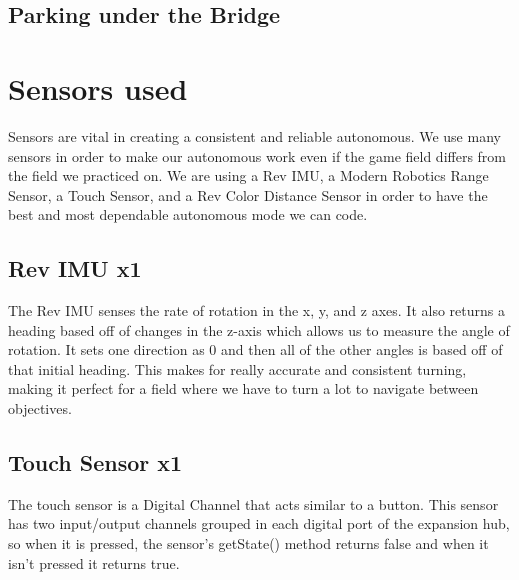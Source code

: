 \documentclass{article}[12pt]
\begin{document}
\subsection{Parking under the Bridge}

\section{Sensors used}
Sensors are vital in creating a consistent and reliable autonomous. We use many sensors in order to make our autonomous work even if the game field differs from the field we practiced on. We are using a Rev IMU, a Modern Robotics Range Sensor, a Touch Sensor, and a Rev Color Distance Sensor in order to have the best and most dependable autonomous mode we can code.


\subsection[Rev IMU for Gyro Turning]{Rev IMU x1}
{The Rev IMU senses the rate of rotation in the x, y, and z axes. It also returns a heading based off of changes in the z-axis which allows us to measure the angle of rotation. It sets one direction as 0 and then all of the other angles is based off of that initial heading. This makes for really accurate and consistent turning, making it perfect for a field where we have to turn a lot to navigate between objectives.} \\


\subsection[Rev Touch Sensor]{Touch Sensor x1}
{The touch sensor is a Digital Channel that acts similar to a button. This sensor has two input/output channels grouped in each digital port of the expansion hub, so when it is pressed, the sensor’s getState() method returns false and when it isn’t pressed it returns true.}\\
\end{document}

